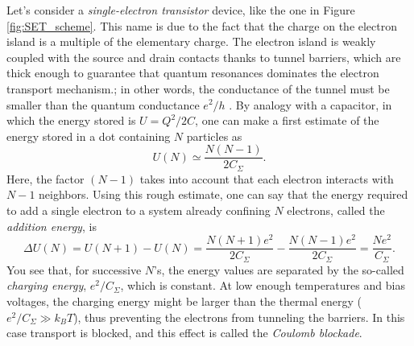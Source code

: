 Let's consider a \emph{single-electron transistor} device, like the one in Figure \ref{fig:SET_scheme}. This name is due to the fact that the charge on the electron island is a multiple of the elementary charge. The electron island is weakly coupled with the source and drain contacts thanks to tunnel barriers, which are thick enough to guarantee that quantum resonances dominates the electron transport mechanism.; in other words, the conductance of the tunnel must be smaller than the quantum conductance $e^2/h$ \citep[see][]{Reimann2002}. By analogy with a capacitor, in which the energy stored is $U=Q^2/2C$, one can make a first estimate of the energy stored in a dot containing $N$ particles as
\begin{equation}
	U(N) \simeq \frac{N(N-1)}{2C_{\Sigma}}.
\end{equation}
Here, the factor $(N-1)$ takes into account that each electron interacts with $N-1$ neighbors. Using this rough estimate, one can say that the energy required to add a single electron to a system already confining $N$ electrons, called the \emph{addition energy}, is
\begin{equation}
	\Delta U (N) = U(N+1)-U(N) = \frac{N(N+1)e^2}{2C_{\Sigma}} - \frac{N(N-1)e^2}{2C_{\Sigma}} = \frac{Ne^2}{C_{\Sigma}}.
\end{equation}
You see that, for successive $N$'s, the energy values are separated by the so-called \emph{charging energy}, $e^2/C_{\Sigma}$, which is constant. At low enough temperatures and bias voltages, the charging energy might be larger than the thermal energy ($e^2/C_{\Sigma} \gg k_BT$), thus preventing the electrons from tunneling the barriers. In this case transport is blocked, and this effect is called the \emph{Coulomb blockade}.

